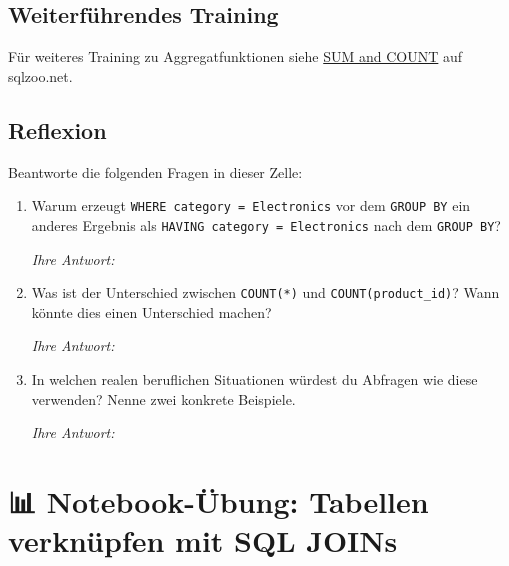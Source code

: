 \documentclass[
  nswissgerman,
  a4paper,
  DIV=11,
  numbers=noendperiod,
  ngerman]{scrreprt}
\begin{document}
\section{Weiterführendes Training}\label{weiterfuxfchrendes-training}

Für weiteres Training zu Aggregatfunktionen siehe
\href{https://sqlzoo.net/wiki/SUM_and_COUNT}{SUM and COUNT} auf
sqlzoo.net.

\section{Reflexion}\label{reflexion}

Beantworte die folgenden Fragen in dieser Zelle:

\begin{enumerate}
\def\labelenumi{\arabic{enumi}.}
\item
  Warum erzeugt
  \texttt{WHERE\ category\ =\ \textquotesingle{}Electronics\textquotesingle{}}
  vor dem \texttt{GROUP\ BY} ein anderes Ergebnis als
  \texttt{HAVING\ category\ =\ \textquotesingle{}Electronics\textquotesingle{}}
  nach dem \texttt{GROUP\ BY}?

  \emph{Ihre Antwort:}
\item
  Was ist der Unterschied zwischen \texttt{COUNT(*)} und
  \texttt{COUNT(product\_id)}? Wann könnte dies einen Unterschied
  machen?

  \emph{Ihre Antwort:}
\item
  In welchen realen beruflichen Situationen würdest du Abfragen wie
  diese verwenden? Nenne zwei konkrete Beispiele.

  \emph{Ihre Antwort:}
\end{enumerate}

\chapter{📊 Notebook-Übung: Tabellen verknüpfen mit SQL
JOINs}\label{notebook-uxfcbung-tabellen-verknuxfcpfen-mit-sql-joins}
\end{document}
